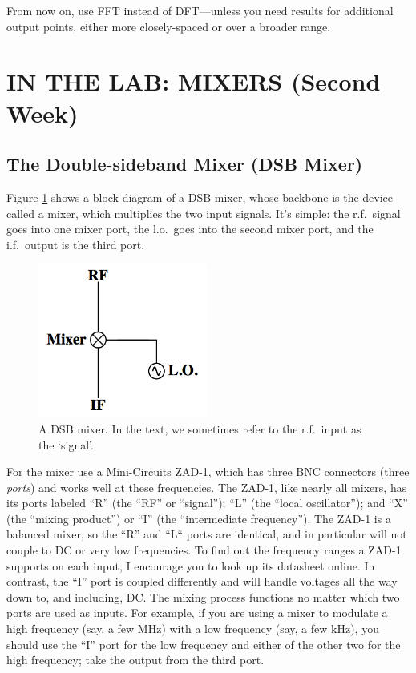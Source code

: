 \documentclass[12pt,preprint]{aastex}
\begin{document}
From now on, use FFT instead of DFT---unless you need results for
additional output points, either more closely-spaced or over a broader
range.



\section{IN THE LAB: MIXERS (Second Week)} \label{mixersect}

\subsection{The Double-sideband Mixer (DSB Mixer)} \label{sectdsb}

Figure \ref{dsb} shows a block diagram of a DSB mixer, whose backbone is
the device called a mixer, which multiplies the two input signals. It's simple: the
r.f.\ signal goes into one mixer port, the l.o.\ goes into the second
mixer port, and the i.f.\ output is the third port.

\begin{figure}[h!]
\begin{center}
  \includegraphics[height=2in]{dsbmixer.png}
\end{center}
\caption{\footnotesize A DSB mixer. In the text, we sometimes refer to
  the r.f.\ input as the `signal'. \label{dsb}}
\end{figure}

For the mixer use a Mini-Circuits ZAD-1, which has three BNC connectors
(three {\it ports}) and works well at these frequencies.  The ZAD-1,
like nearly all mixers, has its ports labeled ``R'' (the ``RF'' or
``signal''); ``L'' (the ``local oscillator''); and ``X'' (the ``mixing
product'') or ``I'' (the ``intermediate frequency'').  The ZAD-1 is a
balanced mixer, so the ``R'' and ``L`` ports are identical, and in
particular will not couple to DC or very low frequencies.  To find out
the frequency ranges a ZAD-1 supports on each input, I encourage
you to look up its datasheet online.  In contrast,
the ``I'' port is coupled differently and will handle voltages all the
way down to, and including, DC.  The mixing process functions no matter
which two ports are used as inputs.  For example, if you are using a
mixer to modulate a high frequency (say, a few MHz) with a low frequency
(say, a few kHz), you should use the ``I'' port for the low frequency
and either of the other two for the high frequency; take the output from
the third port.  
\end{document}
